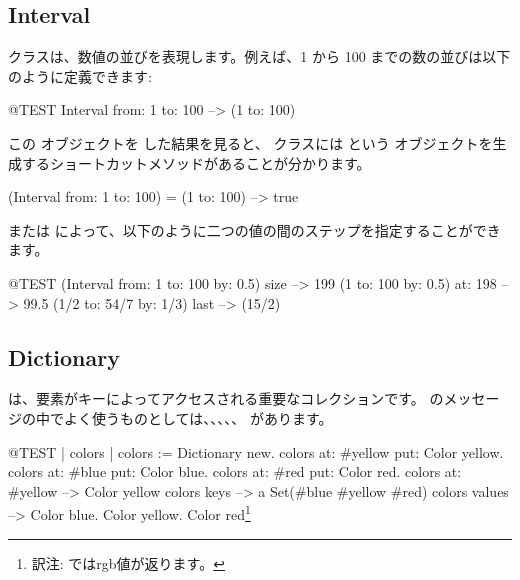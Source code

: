 \documentclass[a4paper,10pt,twoside]{book}
\begin{document}

\subsection{Interval}
 クラスは、数値の並びを表現します。例えば、1 から 100 までの数の並びは以下のように定義できます:
\begin{code}{@TEST}
Interval from: 1 to: 100 --> (1 to: 100)
\end{code}

\noindent
この  オブジェクトを  した結果を見ると、 クラスには  という  オブジェクトを生成するショートカットメソッドがあることが分かります。

\begin{code}{}
(Interval from: 1 to: 100) = (1 to: 100) --> true
\end{code}

 または  によって、以下のように二つの値の間のステップを指定することができます。

\begin{code}{@TEST}
(Interval from: 1 to: 100 by: 0.5) size --> 199
(1 to: 100 by: 0.5) at: 198 --> 99.5
(1/2 to: 54/7 by: 1/3) last --> (15/2)
\end{code}

\subsection{Dictionary}
は、要素がキーによってアクセスされる重要なコレクションです。
のメッセージの中でよく使うものとしては、、、、、 があります。

\begin{code}{@TEST | colors |}
colors := Dictionary new.
colors at: #yellow put: Color yellow.
colors at: #blue put: Color blue.
colors at: #red put: Color red.
colors at: #yellow --> Color yellow
colors keys          --> a Set(#blue #yellow #red)
colors values       --> {Color blue. Color yellow. Color red}\footnote{訳注:  ではrgb値が返ります。}
\end{code}
\end{document}
